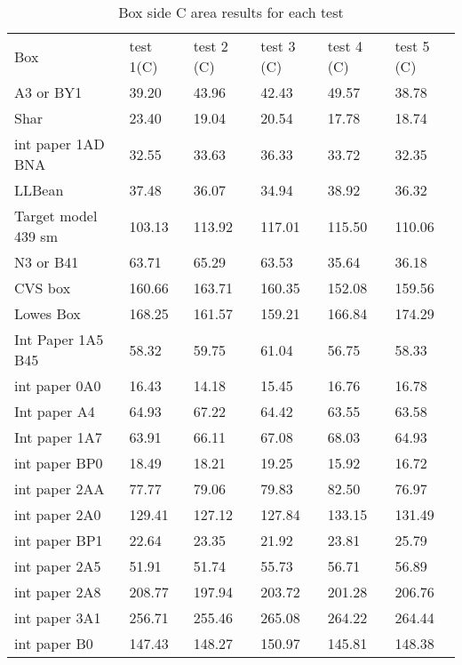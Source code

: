 \documentclass[11pt, twoside, reqno]{book}
\begin{document}
\begin{table}[]
	\centering

	\label{AR1D}
	\begin{tabular}{llllll}
		Box                 & test 1(C) & test 2 (C) & test 3 (C) & test 4 (C) & test 5 (C) \\
		A3 or BY1           & 39.20     & 43.96      & 42.43      & 49.57      & 38.78      \\
		Shar                & 23.40     & 19.04      & 20.54      & 17.78      & 18.74      \\
		int paper 1AD BNA   & 32.55     & 33.63      & 36.33      & 33.72      & 32.35      \\
		LLBean              & 37.48     & 36.07      & 34.94      & 38.92      & 36.32      \\
		Target model 439 sm & 103.13    & 113.92     & 117.01     & 115.50     & 110.06     \\
		N3 or B41           & 63.71     & 65.29      & 63.53      & 35.64      & 36.18      \\
		CVS box             & 160.66    & 163.71     & 160.35     & 152.08     & 159.56     \\
		Lowes Box           & 168.25    & 161.57     & 159.21     & 166.84     & 174.29     \\
		Int Paper 1A5 B45   & 58.32     & 59.75      & 61.04      & 56.75      & 58.33      \\
		int paper 0A0       & 16.43     & 14.18      & 15.45      & 16.76      & 16.78      \\
		Int paper A4        & 64.93     & 67.22      & 64.42      & 63.55      & 63.58      \\
		Int paper 1A7       & 63.91     & 66.11      & 67.08      & 68.03      & 64.93      \\
		int paper BP0       & 18.49     & 18.21      & 19.25      & 15.92      & 16.72      \\
		int paper 2AA       & 77.77     & 79.06      & 79.83      & 82.50      & 76.97      \\
		int paper 2A0       & 129.41    & 127.12     & 127.84     & 133.15     & 131.49     \\
		int paper BP1       & 22.64     & 23.35      & 21.92      & 23.81      & 25.79      \\
		int paper 2A5       & 51.91     & 51.74      & 55.73      & 56.71      & 56.89      \\
		int paper 2A8       & 208.77    & 197.94     & 203.72     & 201.28     & 206.76     \\
		int paper 3A1       & 256.71    & 255.46     & 265.08     & 264.22     & 264.44     \\
		int paper B0        & 147.43    & 148.27     & 150.97     & 145.81     & 148.38    
	\end{tabular}
	\caption{Box side C area results for each test}
\end{table}
\end{document}

